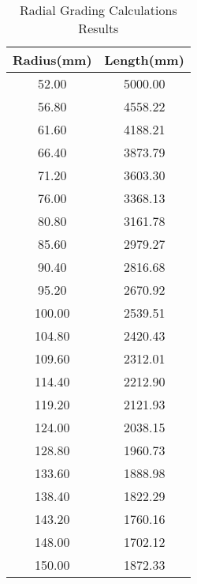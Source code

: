 \begin{table}[!htb]
\caption{Radial Grading Calculations Results}
\label{table:radialvals}
\begin{center}
\begin{tabular}{cc}
\toprule
\textbf{Radius(mm)} & \textbf{Length(mm)} \\ \toprule
52.00 & 5000.00 \\
56.80 & 4558.22 \\
61.60 & 4188.21 \\
66.40 & 3873.79 \\
71.20 & 3603.30 \\
76.00 & 3368.13 \\
80.80 & 3161.78 \\
85.60 & 2979.27 \\
90.40 & 2816.68 \\
95.20 & 2670.92 \\
100.00 & 2539.51 \\
104.80 & 2420.43 \\
109.60 & 2312.01 \\
114.40 & 2212.90 \\
119.20 & 2121.93 \\
124.00 & 2038.15 \\
128.80 & 1960.73 \\
133.60 & 1888.98 \\
138.40 & 1822.29 \\
143.20 & 1760.16 \\
148.00 & 1702.12 \\
150.00 & 1872.33 \\
\bottomrule
\end{tabular}
\end{center}
\end{table}
